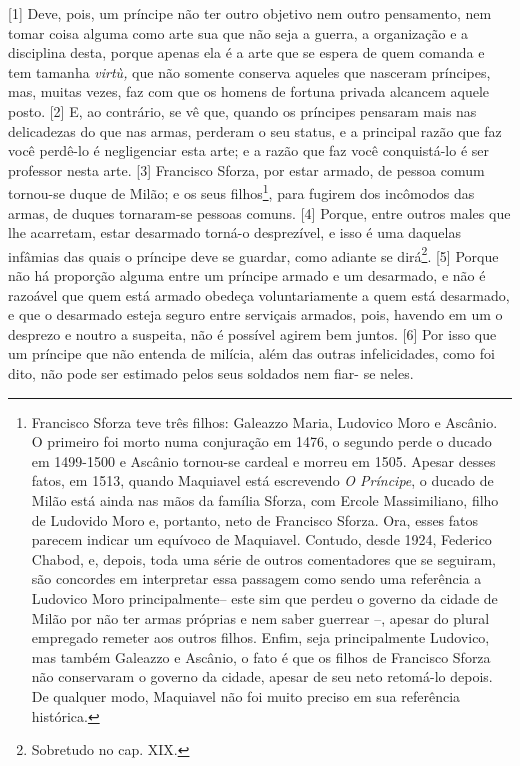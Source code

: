 {[}1{]} Deve, pois, um príncipe não ter outro objetivo nem outro
pensamento, nem tomar coisa alguma como arte sua que não seja a guerra,
a organização e a disciplina desta, porque apenas ela é a arte que se
espera de quem comanda e tem tamanha \emph{virtù,} que não somente
conserva aqueles que nasceram príncipes, mas, muitas vezes, faz com que
os homens de fortuna privada alcancem aquele posto. {[}2{]} E, ao
contrário, se vê que, quando os príncipes pensaram mais nas delicadezas
do que nas armas, perderam o seu status, e a principal razão que faz
você perdê-lo é negligenciar esta arte; e a razão que faz você
conquistá-lo é ser professor nesta arte. {[}3{]} Francisco Sforza, por
estar armado, de pessoa comum tornou-se duque de Milão; e os seus
filhos\footnote{Francisco Sforza teve três filhos: Galeazzo Maria,
  Ludovico Moro e Ascânio. O primeiro foi morto numa conjuração em 1476,
  o segundo perde o ducado em 1499-1500 e Ascânio tornou-se cardeal e
  morreu em 1505. Apesar desses fatos, em 1513, quando Maquiavel está
  escrevendo \emph{O Príncipe}, o ducado de Milão está ainda nas mãos da
  família Sforza, com Ercole Massimiliano, filho de Ludovido Moro e,
  portanto, neto de Francisco Sforza. Ora, esses fatos parecem indicar
  um equívoco de Maquiavel. Contudo, desde 1924, Federico Chabod, e,
  depois, toda uma série de outros comentadores que se seguiram, são
  concordes em interpretar essa passagem como sendo uma referência a
  Ludovico Moro principalmente-- este sim que perdeu o governo da cidade
  de Milão por não ter armas próprias e nem saber guerrear --, apesar do
  plural empregado remeter aos outros filhos. Enfim, seja principalmente
  Ludovico, mas também Galeazzo e Ascânio, o fato é que os filhos de
  Francisco Sforza não conservaram o governo da cidade, apesar de seu
  neto retomá-lo depois. De qualquer modo, Maquiavel não foi muito
  preciso em sua referência histórica.}, para fugirem dos incômodos das
armas, de duques tornaram-se pessoas comuns. {[}4{]} Porque, entre
outros males que lhe acarretam, estar desarmado torná-o desprezível, e
isso é uma daquelas infâmias das quais o príncipe deve se guardar, como
adiante se dirá\footnote{Sobretudo no cap. XIX.}. {[}5{]} Porque não há
proporção alguma entre um príncipe armado e um desarmado, e não é
razoável que quem está armado obedeça voluntariamente a quem está
desarmado, e que o desarmado esteja seguro entre serviçais armados,
pois, havendo em um o desprezo e noutro a suspeita, não é possível
agirem bem juntos. {[}6{]} Por isso que um príncipe que não entenda de
milícia, além das outras infelicidades, como foi dito, não pode ser
estimado pelos seus soldados nem fiar- se neles.

